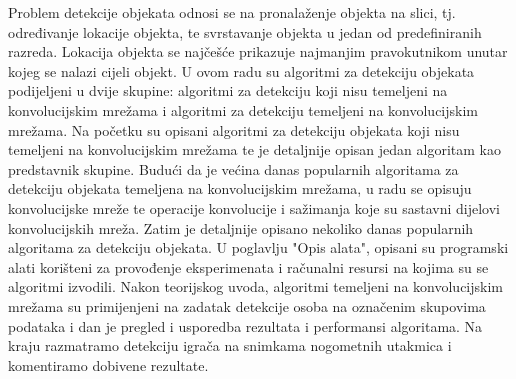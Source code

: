Problem detekcije objekata odnosi se na pronalaženje objekta na slici, tj. određivanje lokacije objekta, te svrstavanje objekta u jedan od predefiniranih razreda. Lokacija objekta se najčešće prikazuje najmanjim pravokutnikom unutar kojeg se nalazi cijeli objekt.
U ovom radu su algoritmi za detekciju objekata podijeljeni u dvije skupine: algoritmi za detekciju koji nisu temeljeni na konvolucijskim mrežama i algoritmi za detekciju temeljeni na konvolucijskim mrežama.
Na početku su opisani algoritmi za detekciju objekata koji nisu temeljeni na konvolucijskim mrežama te je detaljnije opisan jedan algoritam kao predstavnik skupine.
Budući da je većina danas popularnih algoritama za detekciju objekata temeljena na konvolucijskim mrežama, u radu se opisuju konvolucijske mreže te operacije konvolucije i sažimanja koje su sastavni dijelovi konvolucijskih mreža. Zatim je detaljnije opisano nekoliko danas popularnih algoritama za detekciju objekata. 
U poglavlju "Opis alata", opisani su programski alati korišteni za provođenje eksperimenata i računalni resursi na kojima su se algoritmi izvodili.
Nakon teorijskog uvoda, algoritmi temeljeni na konvolucijskim mrežama su primijenjeni na zadatak detekcije osoba na označenim skupovima podataka i dan je pregled i usporedba rezultata i performansi algoritama.
Na kraju razmatramo detekciju igrača na snimkama nogometnih utakmica i komentiramo dobivene rezultate.
